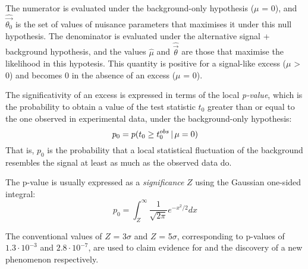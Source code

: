 The numerator is evaluated under the background-only hypothesis ($\mu$ = 0), and $\widehat{\vec{\theta_0}}$ is the set of values of nuisance parameters that maximises it under this null hypothesis.
The denominator is evaluated under the alternative signal + background hypothesis, and the values $\hat{\mu}$ and $\hat{\vec{\theta}}$ are those that maximise the likelihood in this hypotesis.
This quantity is positive for a signal-like excess ($\mu$ > 0) and becomes 0 in the absence of an excess ($\mu$ = 0).

The significativity of an excess is expressed in terms of the local \textit{p-value}, which is the probability to obtain a value of the test statistic $t_0$ greater than or equal to the one observed in experimental data, under the background-only hypothesis:
\begin{equation}
  \label{eq:pvalue}
  p_0 = p(t_0 \ge t_0^{obs}\, |\, \mu = 0)
\end{equation}
That is, $p_0$ is the probability that a local statistical fluctuation of the background resembles the signal at least as much as the observed data do.

The p-value is usually expressed as a \textit{significance} $Z$ using the Gaussian one-sided integral:
\begin{equation}
  \label{eq:significance}
  p_0 = \int_Z^\infty \frac{1}{\sqrt{2\pi}}e^{-x^2/2}dx
\end{equation}

The conventional values of $Z$ = 3$\sigma$ and $Z$ = 5$\sigma$, corresponding to p-values of $1.3 \cdot 10^{-3}$ and $2.8 \cdot 10^{-7}$, are used to claim evidence for and the discovery of a new phenomenon respectively.

